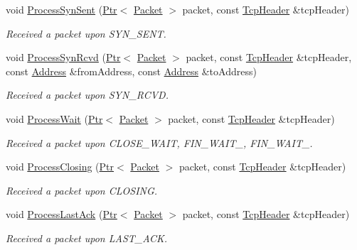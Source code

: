 \begin{DoxyCompactItemize}
void \hyperlink{classns3_1_1TcpSocketBase_a2e9b990c6a4d686291033a393290906b}{Process\+Syn\+Sent} (\hyperlink{classns3_1_1Ptr}{Ptr}$<$ \hyperlink{classns3_1_1Packet}{Packet} $>$ packet, const \hyperlink{classns3_1_1TcpHeader}{Tcp\+Header} \&tcp\+Header)
\begin{DoxyCompactList}\small\item\em Received a packet upon S\+Y\+N\+\_\+\+S\+E\+NT. \end{DoxyCompactList}\item 
void \hyperlink{classns3_1_1TcpSocketBase_a69113acf27c4b8267c9e107a5dca7cc1}{Process\+Syn\+Rcvd} (\hyperlink{classns3_1_1Ptr}{Ptr}$<$ \hyperlink{classns3_1_1Packet}{Packet} $>$ packet, const \hyperlink{classns3_1_1TcpHeader}{Tcp\+Header} \&tcp\+Header, const \hyperlink{classns3_1_1Address}{Address} \&from\+Address, const \hyperlink{classns3_1_1Address}{Address} \&to\+Address)
\begin{DoxyCompactList}\small\item\em Received a packet upon S\+Y\+N\+\_\+\+R\+C\+VD. \end{DoxyCompactList}\item 
void \hyperlink{classns3_1_1TcpSocketBase_a58aa892c1cb33908aca5ca36967a2a99}{Process\+Wait} (\hyperlink{classns3_1_1Ptr}{Ptr}$<$ \hyperlink{classns3_1_1Packet}{Packet} $>$ packet, const \hyperlink{classns3_1_1TcpHeader}{Tcp\+Header} \&tcp\+Header)
\begin{DoxyCompactList}\small\item\em Received a packet upon C\+L\+O\+S\+E\+\_\+\+W\+A\+IT, F\+I\+N\+\_\+\+W\+A\+I\+T\+\_, F\+I\+N\+\_\+\+W\+A\+I\+T\+\_. \end{DoxyCompactList}\item 
void \hyperlink{classns3_1_1TcpSocketBase_abc2462833556fdd737fdcdc5992768e8}{Process\+Closing} (\hyperlink{classns3_1_1Ptr}{Ptr}$<$ \hyperlink{classns3_1_1Packet}{Packet} $>$ packet, const \hyperlink{classns3_1_1TcpHeader}{Tcp\+Header} \&tcp\+Header)
\begin{DoxyCompactList}\small\item\em Received a packet upon C\+L\+O\+S\+I\+NG. \end{DoxyCompactList}\item 
void \hyperlink{classns3_1_1TcpSocketBase_a6700ac3f9e4d3c197499e6b7521205f2}{Process\+Last\+Ack} (\hyperlink{classns3_1_1Ptr}{Ptr}$<$ \hyperlink{classns3_1_1Packet}{Packet} $>$ packet, const \hyperlink{classns3_1_1TcpHeader}{Tcp\+Header} \&tcp\+Header)
\begin{DoxyCompactList}\small\item\em Received a packet upon L\+A\+S\+T\+\_\+\+A\+CK. \end{DoxyCompactList}\item 

\end{DoxyCompactItemize}
